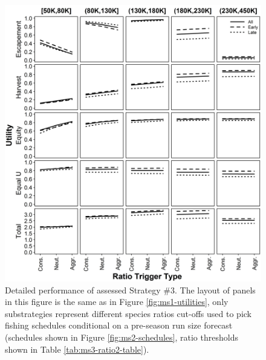 \documentclass[12pt,]{book}
\theoremstyle{definition}
\theoremstyle{definition}
\theoremstyle{definition}
\theoremstyle{remark}
\begin{document}
\begin{singlespace}
\clearpage
\begin{figure}
  \centering
  \includegraphics{img/Ch3/Values_3.jpg}
  \caption{Detailed performance of assessed Strategy \#3. The layout of panels in this figure is the same as in Figure \ref{fig:ms1-utilities}, only substrategies represent different species ratios cut-offs used to pick fishing schedules conditional on a pre-season run size forecast (schedules shown in Figure \ref{fig:ms2-schedules}, ratio thresholds shown in Table \ref{tab:ms3-ratio2-table}).}
  \label{fig:ms3-utilities}
\end{figure}


\end{singlespace}
\end{document}
